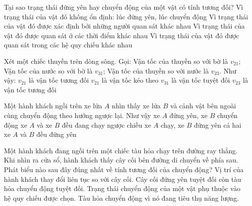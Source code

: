 \begin{ex}
Tại sao trạng thái đứng yên hay chuyển động của một vật có tính tương đối?
\choice
{Vì trạng thái của vật đó không ổn định: lúc đứng yên, lúc chuyển động}
{\True Vì trạng thái của vật đó được xác định bởi những người quan sát khác nhau}
{Vì trạng thái của vật đó được quan sát ở các thời điểm khác nhau}
{Vì trạng thái của vật đó được quan sát trong các hệ quy chiếu khác nhau}
\end{ex}

\begin{ex}
Xét một chiếc thuyền trên dòng sông. Gọi: Vận tốc của thuyền so với bờ là $v_{21}$; Vận tốc của nước so với bờ là $v_{31}$; Vận tốc của thuyền so với nước là $v_{23}$. Như vậy:
\choice
{$v_{21}$ là vận tốc tương đối}
{$v_{21}$ là vận tốc kéo theo}
{\True $v_{31}$ là vận tốc tuyệt đối}
{$v_{23}$ là vận tốc tương đối}
\end{ex}

\begin{ex}
Một hành khách ngồi trên xe lửa $A$ nhìn thấy xe lửa $B$ và cảnh vật bên ngoài cùng chuyển động theo hướng ngược lại. Như vậy
\choice
{xe $A$ đứng yên, xe $B$ chuyển động}
{\True xe $A$ và xe $B$ đều đang chạy ngược chiều}
{xe $A$ chạy, xe $B$ đứng yên}
{cả hai xe $A$ và $B$ đều đứng yên}
\end{ex}

\begin{ex}
Một hành khách đang ngồi trên một chiếc tàu hỏa chạy trên đường ray thẳng. Khi nhìn ra cửa sổ, hành khách thấy cây cối bên đường di chuyển về phía sau. Phát biểu nào sau đây đúng nhất về tính tương đối của chuyển động?
\choice
{Vị trí của hành khách thay đổi liên tục so với cây cối.}
{Cây cối đứng yên tuyệt đối còn tàu hỏa chuyển động tuyệt đối.}
{\True Trạng thái chuyển động của một vật phụ thuộc vào hệ quy chiếu được chọn.}
{Tàu hỏa chuyển động vì nó đang tiêu thụ năng lượng.}
\end{ex}

